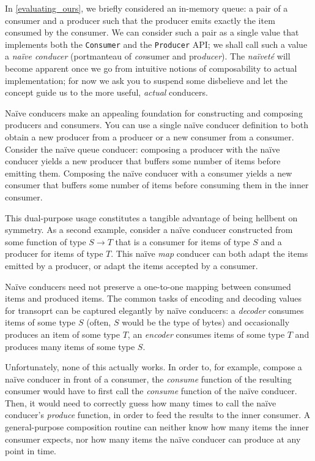 \documentclass[sigplan,screen,10pt,anonymous,review]{acmart}
\begin{document}
In \cref{evaluating_ours}, we briefly considered an in-memory queue: a pair of a consumer and a producer such that the producer emits exactly the item consumed by the consumer. We can consider such a pair as a single value that implements both the \texttt{Consumer} and the \texttt{Producer} API; we shall call such a value a \textit{naïve conducer} (portmanteau of \textit{con}sumer and pro\textit{ducer}). The \textit{naïveté} will become apparent once we go from intuitive notions of composability to actual implementation; for now we ask you to suspend some disbelieve and let the concept guide us to the more useful, \textit{actual} conducers.

Naïve conducers make an appealing foundation for constructing and composing producers and consumers. You can use a single naïve conducer definition to both obtain a new producer from a producer or a new consumer from a consumer. Consider the naïve queue conducer: composing a producer with the naïve conducer yields a new producer that buffers some number of items before emitting them. Composing the naïve conducer with a consumer yields a new consumer that buffers some number of items before consuming them in the inner consumer.

This dual-purpose usage constitutes a tangible advantage of being hellbent on symmetry. As a second example, consider a naïve conducer constructed from some function of type $S \rightarrow T$ that is a consumer for items of type $S$ and a producer for items of type $T$. This naïve \textit{map} conducer can both adapt the items emitted by a producer, or adapt the items accepted by a consumer.%

Naïve conducers need not preserve a one-to-one mapping between consumed items and produced items. The common tasks of encoding and decoding values for transoprt can be captured elegantly by naïve conducers: a \textit{decoder} consumes items of some type $S$ (often, $S$ would be the type of bytes) and occasionally produces an item of some type $T$, an \textit{encoder} consumes items of some type $T$ and produces many items of some type $S$.

Unfortunately, none of this actually works. In order to, for example, compose a naïve conducer in front of a consumer, the \textit{consume} function of the resulting consumer would have to first call the \textit{consume} function of the naïve conducer. Then, it would need to correctly guess how many times to call the naïve conducer's \textit{produce} function, in order to feed the results to the inner consumer. A general-purpose composition routine can neither know how many items the inner consumer expects, nor how many items the naïve conducer can produce at any point in time.
\end{document}
